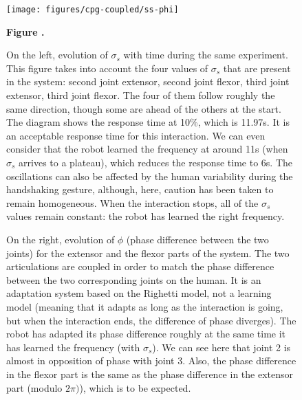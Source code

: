\begin{figure}[h!]
\begin{center}
\texttt{[image: figures/cpg-coupled/ss-phi]}
\end{center}
\textbf{\label{fig:17} Figure .}{ On the left, evolution of $\sigma_{s}$ with time during the same experiment. This figure takes into account the four values of $\sigma_{s}$ that are present in the system: second joint extensor, second joint flexor, third joint extensor, third joint flexor. The four of them follow roughly the same direction, though some are ahead of the others at the start. The diagram shows the response time at 10\%, which is 11.97s. It is an acceptable response time for this interaction. We can even consider that the robot learned the frequency at around 11s (when $\sigma_{s}$ arrives to a plateau), which reduces the response time to 6s. The oscillations can also be affected by the human variability during the handshaking gesture, although, here, caution has been taken to remain homogeneous. When the interaction stops, all of the $\sigma_{s}$ values remain constant: the robot has learned the right frequency. 

On the right, evolution of $\phi$ (phase difference between the two joints) for the extensor and the flexor parts of the system. The two articulations are coupled in order to match the phase difference between the two corresponding joints on the human. It is an adaptation system based on the Righetti model, not a learning model (meaning that it adapts as long as the interaction is going, but when the interaction ends, the difference of phase diverges). The robot has adapted its phase difference roughly at the same time it has learned the frequency (with $\sigma_{s}$). We can see here that joint 2 is almost in opposition of phase with joint 3. Also, the phase difference in the flexor part is the same as the phase difference in the extensor part (modulo $2 \pi)$), which is to be expected.}
\end{figure}



